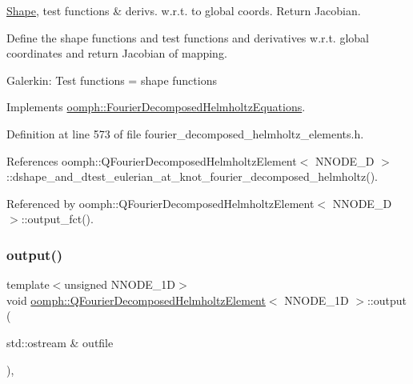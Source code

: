 \hyperlink{classoomph_1_1Shape}{Shape}, test functions \& derivs. w.\+r.\+t. to global coords. Return Jacobian.

Define the shape functions and test functions and derivatives w.\+r.\+t. global coordinates and return Jacobian of mapping.

Galerkin\+: Test functions = shape functions 

Implements \hyperlink{classoomph_1_1FourierDecomposedHelmholtzEquations_a9a0a3a0452e40681fbe610bb7a797252}{oomph\+::\+Fourier\+Decomposed\+Helmholtz\+Equations}.



Definition at line 573 of file fourier\+\_\+decomposed\+\_\+helmholtz\+\_\+elements.\+h.



References oomph\+::\+Q\+Fourier\+Decomposed\+Helmholtz\+Element$<$ N\+N\+O\+D\+E\+\_\+D $>$\+::dshape\+\_\+and\+\_\+dtest\+\_\+eulerian\+\_\+at\+\_\+knot\+\_\+fourier\+\_\+decomposed\+\_\+helmholtz().



Referenced by oomph\+::\+Q\+Fourier\+Decomposed\+Helmholtz\+Element$<$ N\+N\+O\+D\+E\+\_\+D $>$\+::output\+\_\+fct().

\mbox{\label{classoomph_1_1QFourierDecomposedHelmholtzElement_a5182e60d2d855fc2724dabae242157aa}} 
\subsubsection{\texorpdfstring{output()}{output()}\hspace{0.1cm}{\footnotesize\ttfamily [1/4]}}
{\footnotesize\ttfamily template$<$unsigned N\+N\+O\+D\+E\+\_\+1D$>$ \\
void \hyperlink{classoomph_1_1QFourierDecomposedHelmholtzElement}{oomph\+::\+Q\+Fourier\+Decomposed\+Helmholtz\+Element}$<$ N\+N\+O\+D\+E\+\_\+1D $>$\+::output (\begin{DoxyParamCaption}\item[{std\+::ostream \&}]{outfile }\end{DoxyParamCaption})\hspace{0.3cm}{\ttfamily [inline]}, {\ttfamily [virtual]}}



